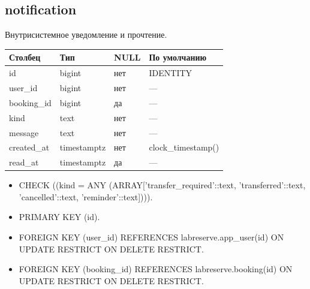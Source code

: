 \par\noindent\begin{minipage}{\linewidth}
\subsection{notification}
Внутрисистемное уведомление и прочтение.\par\smallskip\noindent
\begin{tabular}{p{}p{}p{}p{}}
\toprule Столбец & Тип & NULL & По умолчанию \\ \midrule
id & bigint & нет & IDENTITY \\
user\_\allowbreak{}id & bigint & нет & — \\
booking\_\allowbreak{}id & bigint & да & — \\
kind & text & нет & — \\
message & text & нет & — \\
created\_\allowbreak{}at & timestamptz & нет & clock\_\allowbreak{}timestamp() \\
read\_\allowbreak{}at & timestamptz & да & — \\
\bottomrule\end{tabular}\end{minipage}\par
\begin{itemize}
\item CHECK ((kind = ANY (ARRAY['transfer\_\allowbreak{}required'::text, 'transferred'::text, 'cancelled'::text, 'reminder'::text]))).
\item PRIMARY KEY (id).
\item FOREIGN KEY (user\_\allowbreak{}id) REFERENCES labreserve.app\_\allowbreak{}user(id) ON UPDATE RESTRICT ON DELETE RESTRICT.
\item FOREIGN KEY (booking\_\allowbreak{}id) REFERENCES labreserve.booking(id) ON UPDATE RESTRICT ON DELETE RESTRICT.
\end{itemize}